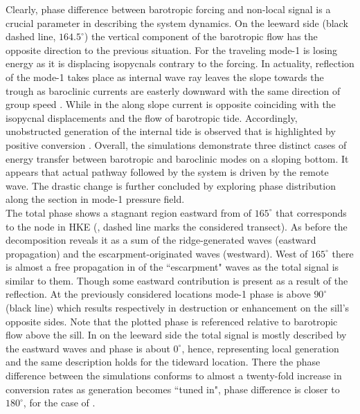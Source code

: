 \documentclass[12pt]{article}
\begin{document}
Clearly, phase difference between barotropic forcing and non-local signal is a crucial parameter 
in describing the system dynamics. On the leeward side (black dashed line, $164.5^{\circ}$) the 
vertical 
component of the barotropic flow has the opposite direction to the previous situation. For 
 the traveling mode-1 is losing energy as it is displacing isopycnals contrary to the 
forcing. In actuality, reflection of the mode-1 takes place as internal wave ray leaves the 
slope towards the trough as baroclinic currents are easterly downward with the same direction of 
group speed . While in  the along slope current is opposite 
coinciding with the isopycnal 
displacements and the flow of barotropic tide. Accordingly, unobstructed generation of the internal 
tide is observed that is highlighted by positive conversion . Overall, 
the simulations demonstrate three distinct cases of energy transfer between barotropic 
and baroclinic modes on a sloping bottom. It appears that actual pathway followed by the system 
is driven by the remote wave. The drastic change is further concluded by exploring phase 
distribution along the section  in mode-1 pressure field.\\
The total phase shows a stagnant region eastward from of $165^{\circ}$ that corresponds to the node 
in HKE (, dashed line marks the considered transect). As before the 
decomposition reveals it as a sum of the ridge-generated waves (eastward propagation) and the 
escarpment-originated waves (westward). West of $165^{\circ}$ there is almost a free propagation in 
 of the ``escarpment" waves as the total signal is similar to them. Though some 
eastward contribution is present as a result of the 
reflection. At the previously considered locations mode-1 phase is above $90^{\circ}$ (black line) 
which results respectively in destruction or enhancement on the sill's opposite sides. Note that 
the plotted phase is referenced relative to barotropic flow above the sill. In  on the 
leeward side the total signal is mostly described by the eastward waves and phase is about 
$0^{\circ}$, hence, representing local generation and the same description holds for the 
tideward location. There the phase difference between the simulations conforms to almost a   
twenty-fold increase in conversion rates as generation becomes ``tuned in", phase difference is 
closer to $180^{\circ}$, for the case of .
\end{document}
